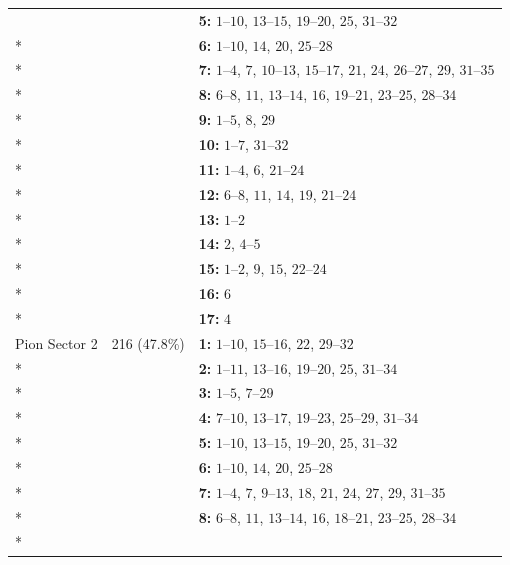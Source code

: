 \begin{longtable}{p{3.5cm}p{2.2cm}p{8.3cm}}
 &  & \textbf{5:} \mbox{$1$--$10$}, \mbox{$13$--$15$}, \mbox{$19$--$20$}, \mbox{$25$}, \mbox{$31$--$32$} \\*
 &  & \textbf{6:} \mbox{$1$--$10$}, \mbox{$14$}, \mbox{$20$}, \mbox{$25$--$28$} \\*
 &  & \textbf{7:} \mbox{$1$--$4$}, \mbox{$7$}, \mbox{$10$--$13$}, \mbox{$15$--$17$}, \mbox{$21$}, \mbox{$24$}, \mbox{$26$--$27$}, \mbox{$29$}, \mbox{$31$--$35$} \\*
 &  & \textbf{8:} \mbox{$6$--$8$}, \mbox{$11$}, \mbox{$13$--$14$}, \mbox{$16$}, \mbox{$19$--$21$}, \mbox{$23$--$25$}, \mbox{$28$--$34$} \\*
 &  & \textbf{9:} \mbox{$1$--$5$}, \mbox{$8$}, \mbox{$29$} \\*
 &  & \textbf{10:} \mbox{$1$--$7$}, \mbox{$31$--$32$} \\*
 &  & \textbf{11:} \mbox{$1$--$4$}, \mbox{$6$}, \mbox{$21$--$24$} \\*
 &  & \textbf{12:} \mbox{$6$--$8$}, \mbox{$11$}, \mbox{$14$}, \mbox{$19$}, \mbox{$21$--$24$} \\*
 &  & \textbf{13:} \mbox{$1$--$2$} \\*
 &  & \textbf{14:} \mbox{$2$}, \mbox{$4$--$5$} \\*
 &  & \textbf{15:} \mbox{$1$--$2$}, \mbox{$9$}, \mbox{$15$}, \mbox{$22$--$24$} \\*
 &  & \textbf{16:} \mbox{$6$} \\*
 &  & \textbf{17:} \mbox{$4$} \\
\addlinespace
Pion Sector 2 & 216 (47.8\%) & \textbf{1:} \mbox{$1$--$10$}, \mbox{$15$--$16$}, \mbox{$22$}, \mbox{$29$--$32$} \\*
 &  & \textbf{2:} \mbox{$1$--$11$}, \mbox{$13$--$16$}, \mbox{$19$--$20$}, \mbox{$25$}, \mbox{$31$--$34$} \\*
 &  & \textbf{3:} \mbox{$1$--$5$}, \mbox{$7$--$29$} \\*
 &  & \textbf{4:} \mbox{$7$--$10$}, \mbox{$13$--$17$}, \mbox{$19$--$23$}, \mbox{$25$--$29$}, \mbox{$31$--$34$} \\*
 &  & \textbf{5:} \mbox{$1$--$10$}, \mbox{$13$--$15$}, \mbox{$19$--$20$}, \mbox{$25$}, \mbox{$31$--$32$} \\*
 &  & \textbf{6:} \mbox{$1$--$10$}, \mbox{$14$}, \mbox{$20$}, \mbox{$25$--$28$} \\*
 &  & \textbf{7:} \mbox{$1$--$4$}, \mbox{$7$}, \mbox{$9$--$13$}, \mbox{$18$}, \mbox{$21$}, \mbox{$24$}, \mbox{$27$}, \mbox{$29$}, \mbox{$31$--$35$} \\*
 &  & \textbf{8:} \mbox{$6$--$8$}, \mbox{$11$}, \mbox{$13$--$14$}, \mbox{$16$}, \mbox{$18$--$21$}, \mbox{$23$--$25$}, \mbox{$28$--$34$} \\*

\end{longtable}
